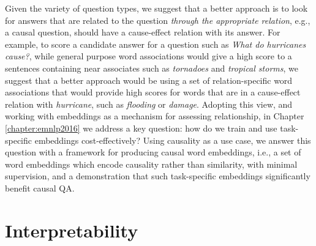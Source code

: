 Given the variety of question types, we suggest that a better approach is to look for answers that are related to the question \emph{through the appropriate relation}, e.g., a causal question, should have a cause-effect relation with its answer.  For example, to score a candidate answer for a question such as \emph{What do hurricanes cause?}, while general purpose word associations would give a high score to a sentences containing near associates such as \emph{tornadoes} and \emph{tropical storms}, we suggest that a better approach would be using a set of relation-specific word associations that would provide high scores for words that are in a cause-effect relation with \emph{hurricane}, such as \emph{flooding} or \emph{damage}.
Adopting this view, and working with embeddings as a mechanism for assessing relationship, in Chapter \ref{chapter:emnlp2016} we address a key question: how do we train and use task-specific embeddings cost-effectively? 
Using causality as a use case, we answer this question with a framework for producing causal word embeddings, i.e., a set of word embeddings which encode causality rather than similarity, with minimal supervision, and a demonstration that such task-specific embeddings significantly benefit causal QA. 

\section{Interpretability}
\label{sec:interpretability}





